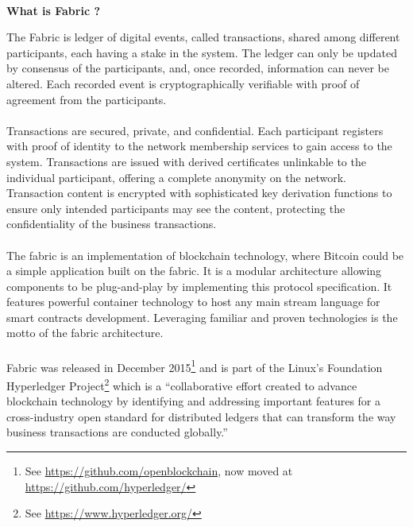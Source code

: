 			\paragraph{}
 			\textbf{What is Fabric ?}
 			\begin{displayquote}The Fabric is ledger of digital events, called transactions, shared among different participants, each having a stake in the system. The ledger can only be updated by consensus of the participants, and, once recorded, information can never be altered. Each recorded event is cryptographically verifiable with proof of agreement from the participants.
 			\paragraph{}
 			Transactions are secured, private, and confidential. Each participant registers with proof of identity to the network membership services to gain access to the system. Transactions are issued with derived certificates unlinkable to the individual participant, offering a complete anonymity on the network. Transaction content is encrypted with sophisticated key derivation functions to ensure only intended participants may see the content, protecting the confidentiality of the business transactions.
 			\paragraph{}
 			The fabric is an implementation of blockchain technology, where Bitcoin could be a simple application built on the fabric. It is a modular architecture allowing components to be plug-and-play by implementing this protocol specification. It features powerful container technology to host any main stream language for smart contracts development. Leveraging familiar and proven technologies is the motto of the fabric architecture.
 			\end{displayquote}
 			\paragraph{}
 			Fabric was released in December 2015\footnote{See \url{https://github.com/openblockchain}, now moved at  \url{https://github.com/hyperledger/}} and is part of the Linux's Foundation Hyperledger Project\footnote{See \url{https://www.hyperledger.org/}} which is a ``collaborative effort created to advance blockchain technology by identifying and addressing important features for a cross-industry open standard for distributed ledgers that can transform the way business transactions are conducted globally.''
